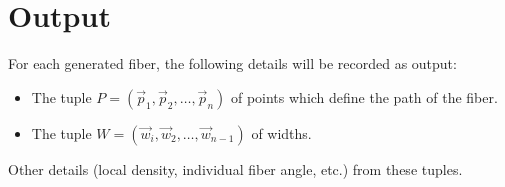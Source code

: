 \documentclass[12pt]{article}
\begin{document}
\section*{Output}

For each generated fiber, the following details will be recorded as output:
\begin{itemize}
    \item The tuple $P = (\vec{p}_1, \vec{p}_2, \ldots, \vec{p}_n)$ of points which define the path of the fiber.
    \item The tuple $W = (\vec{w}_i, \vec{w}_2, \ldots, \vec{w}_{n - 1})$ of widths.
\end{itemize}
Other details (local density, individual fiber angle, etc.) from these tuples.
\end{document}
